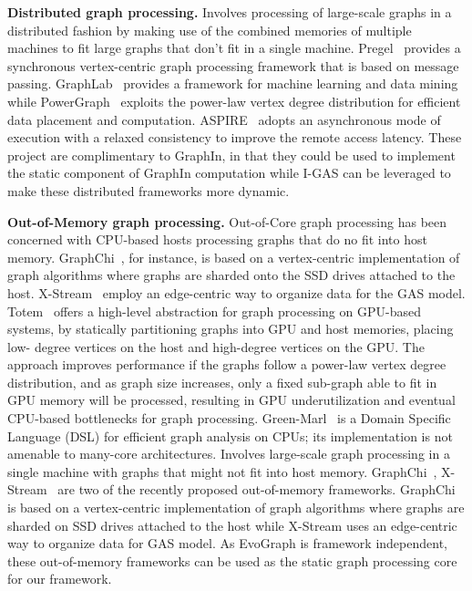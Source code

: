 \textbf{Distributed graph processing.} Involves processing of large-scale graphs in a distributed fashion by making use of the combined memories of multiple machines to fit large graphs that don’t fit in a single machine. Pregel~\cite{pregel} provides a synchronous vertex-centric graph processing framework that is based on message passing. GraphLab~\cite{graphlab} provides a framework for machine learning and data mining while PowerGraph~\cite{powergraph} exploits the power-law vertex degree distribution for efficient data placement and computation. ASPIRE~\cite{aspire} adopts an asynchronous mode of execution with a relaxed consistency to improve the remote access latency. These project are complimentary to GraphIn, in that they could be used to implement the static component of GraphIn  computation while I-GAS can be leveraged to make these distributed frameworks more dynamic. 


\textbf{Out-of-Memory graph processing.} Out-of-Core graph processing has been concerned with CPU-based hosts processing graphs that do no fit into host memory. GraphChi~\cite{chi}, for instance, is based on a vertex-centric implementation of graph algorithms where graphs are sharded onto the SSD drives attached to the host. X-Stream~\cite{xstream} employ an edge-centric way to organize data for the GAS model. Totem~\cite{totem} offers a high-level abstraction for graph processing on GPU-based systems, by statically partitioning graphs into GPU and host memories, placing low- degree vertices on the host and high-degree vertices on the GPU. The approach improves performance if the graphs follow a power-law vertex degree distribution, and as graph size increases, only a fixed sub-graph able to fit in GPU memory will be processed, resulting in GPU underutilization and eventual CPU-based bottlenecks for graph processing. Green-Marl~\cite{green} is a Domain Specific Language (DSL) for efficient graph analysis on CPUs; its implementation is not amenable to many-core architectures.
Involves large-scale graph processing in a single machine with graphs that might not fit into host memory. GraphChi~\cite{chi},  X-Stream~\cite{xstream} are two of the recently proposed out-of-memory frameworks. GraphChi is based on a vertex-centric implementation of graph algorithms where graphs are sharded on SSD drives attached to the host while X-Stream uses an edge-centric way to organize data for GAS model. As EvoGraph is framework independent, these out-of-memory frameworks can be used as the static graph processing core for our framework.
\fi

